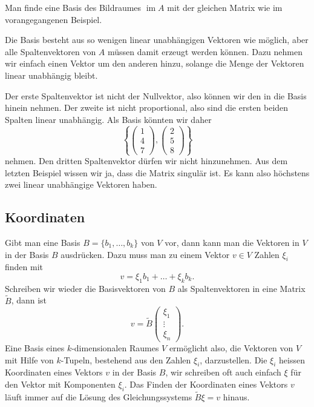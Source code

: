 \begin{beispiel}
Man finde eine Basis des Bildraumes $\operatorname{im}A$ mit der gleichen
Matrix wie im vorangegangenen Beispiel.

Die Basis besteht aus so wenigen linear unabhängigen Vektoren wie
möglich, aber alle Spaltenvektoren von $A$ müssen damit erzeugt
werden können.
Dazu nehmen wir einfach einen Vektor um den anderen
hinzu, solange die Menge der Vektoren linear unabhängig bleibt.

Der erste Spaltenvektor ist nicht der Nullvektor, also können wir
den in die Basis hinein nehmen.
Der zweite ist nicht proportional,
also sind die ersten beiden Spalten linear unabhängig.
Als
Basis könnten wir daher
\[
\left\{
\begin{pmatrix}1\\4\\7\end{pmatrix}
,
\begin{pmatrix}2\\5\\8\end{pmatrix}
\right\}
\]
nehmen.
Den dritten Spaltenvektor dürfen wir nicht hinzunehmen.
Aus dem letzten Beispiel wissen wir ja, dass die Matrix singulär
ist.
Es kann also höchstens zwei linear unabhängige Vektoren haben.
\end{beispiel}

\subsection{Koordinaten}
Gibt man eine Basis $B=\{b_1,\dots,b_k\}$ von $V$ vor,
dann kann man die Vektoren
in $V$ in der Basis $B$ ausdrücken.
Dazu muss man zu einem 
Vektor $v\in V$ Zahlen $\xi_i$ finden mit
\[
v=\xi_1 b_1+\dots +\xi_k b_k.
\]
Schreiben wir wieder die Basisvektoren von $B$ als Spaltenvektoren in 
eine Matrix $\tilde B$, dann ist 
\[
v=\tilde B\begin{pmatrix}\xi_1\\\vdots\\\xi_n\end{pmatrix}.
\]
Eine Basis eines $k$-dimensionalen Raumes $V$ ermöglicht also,
die Vektoren von $V$ mit Hilfe von $k$-Tupeln, bestehend
aus den Zahlen $\xi_i$, darzustellen.
Die $\xi_i$ heissen
Koordinaten eines Vektors $v$ in der Basis $B$, wir schreiben
oft auch einfach $\xi$ für den Vektor mit Komponenten $\xi_i$.
Das Finden der Koordinaten eines Vektors $v$ läuft immer auf die Lösung
des Gleichungssystems $\tilde B\xi=v$ hinaus.


